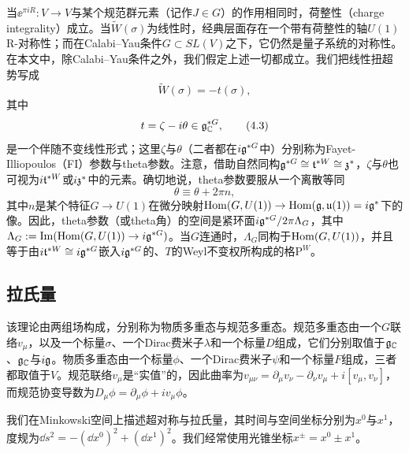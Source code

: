 当$\ee^{\pi iR}:V\to V$与某个规范群元素（记作$J\in G$）的作用相同时，荷整性（charge integrality）成立。当$\widetilde{W}(\sigma)$为线性时，经典层面存在一个带有荷整性的轴$U(1)$ R-对称性；而在Calabi–Yau条件$G\subset SL(V)$之下，它仍然是量子系统的对称性。在本文中，除Calabi–Yau条件之外，我们假定上述一切都成立。我们把线性扭超势写成
\begin{equation}
\widetilde{W}(\sigma)=-t(\sigma),
\tag{4.2}
\end{equation}
其中
\begin{equation}
t=\zeta-i\theta\in\mathfrak{g}^{*G}_{\mathbb{C}},
\tag{4.3}
\end{equation}
是一个伴随不变线性形式；这里$\zeta$与$\theta$（二者都在$i\mathfrak{g}^{*G}$中）分别称为Fayet-Illiopoulos（FI）参数与theta参数。注意，借助自然同构$\mathfrak{g}^{*G}\cong\mathfrak{t}^{*W}\cong\mathfrak{z}^*$，$\zeta$与$\theta$也可视为$i\mathfrak{t}^{*W}$或$i\mathfrak{z}^*$中的元素。确切地说，theta参数要服从一个离散等同
\begin{equation}
\theta\equiv\theta+2\pi n,
\tag{4.4}
\end{equation}
其中$n$是某个特征$G\to U(1)$在微分映射$\operatorname{Hom}(G,U(1))\to\operatorname{Hom}(\mathfrak{g},\mathfrak{u}(1))=i\mathfrak{g}^*$下的像。因此，theta参数（或theta角）的空间是紧环面$i\mathfrak{g}^{*G}/2\pi\Lambda_G$，其中$\Lambda_G:=\operatorname{Im}(\operatorname{Hom}(G,U(1))\to i\mathfrak{g}^{*G})$。当$G$连通时，$\Lambda_G$同构于$\operatorname{Hom}(G,U(1))$，并且等于由$i\mathfrak{t}^{*W}\cong i\mathfrak{g}^{*G}$嵌入$i\mathfrak{g}^{*G}$的、$T$的Weyl不变权所构成的格$\mathrm{P}^W$。


\subsection{拉氏量}

该理论由两组场构成，分别称为物质多重态与规范多重态。规范多重态由一个$G$联络$v_\mu$，以及一个标量$\sigma$、一个Dirac费米子$\lambda$和一个标量$D$组成，它们分别取值于$\mathfrak{g}_{\mathbb{C}}$、$\mathfrak{g}_{\mathbb{C}}$与$i\mathfrak{g}$。物质多重态由一个标量$\phi$、一个Dirac费米子$\psi$和一个标量$F$组成，三者都取值于$V$。规范联络$v_\mu$是“实值”的，因此曲率为$v_{\mu\nu}=\partial_\mu v_\nu-\partial_\nu v_\mu+i[v_\mu,v_\nu]$，而规范协变导数为$D_\mu\phi=\partial_\mu\phi+iv_\mu\phi$。

我们在Minkowski空间上描述超对称与拉氏量，其时间与空间坐标分别为$x^0$与$x^1$，度规为$\dd s^2=-(\dd x^0)^2+(\dd x^1)^2$。我们经常使用光锥坐标$x^\pm=x^0\pm x^1$。
